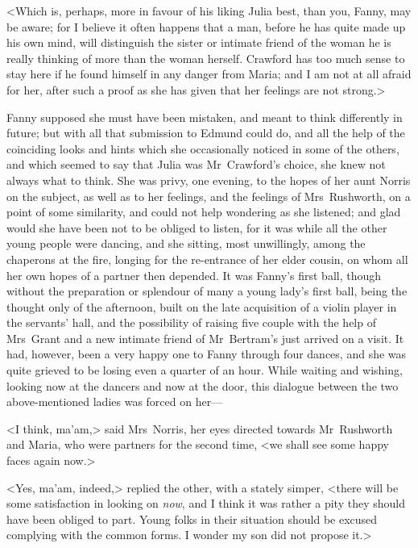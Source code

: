 <Which is, perhaps, more in favour of his liking Julia best, than you, Fanny, may be aware; for I believe it often happens that a man, before he has quite made up his own mind, will distinguish the sister or intimate friend of the woman he is really thinking of more than the woman herself. Crawford has too much sense to stay here if he found himself in any danger from Maria; and I am not at all afraid for her, after such a proof as she has given that her feelings are not strong.>

Fanny supposed she must have been mistaken, and meant to think differently in future; but with all that submission to Edmund could do, and all the help of the coinciding looks and hints which she occasionally noticed in some of the others, and which seemed to say that Julia was Mr~Crawford's choice, she knew not always what to think. She was privy, one evening, to the hopes of her aunt Norris on the subject, as well as to her feelings, and the feelings of Mrs~Rushworth, on a point of some similarity, and could not help wondering as she listened; and glad would she have been not to be obliged to listen, for it was while all the other young people were dancing, and she sitting, most unwillingly, among the chaperons at the fire, longing for the re-entrance of her elder cousin, on whom all her own hopes of a partner then depended. It was Fanny's first ball, though without the preparation or splendour of many a young lady's first ball, being the thought only of the afternoon, built on the late acquisition of a violin player in the servants' hall, and the possibility of raising five couple with the help of Mrs~Grant and a new intimate friend of Mr~Bertram's just arrived on a visit. It had, however, been a very happy one to Fanny through four dances, and she was quite grieved to be losing even a quarter of an hour. While waiting and wishing, looking now at the dancers and now at the door, this dialogue between the two above-mentioned ladies was forced on her—

<I think, ma'am,> said Mrs~Norris, her eyes directed towards Mr~Rushworth and Maria, who were partners for the second time, <we shall see some happy faces again now.>

<Yes, ma'am, indeed,> replied the other, with a stately simper, <there will be some satisfaction in looking on \textit{now}, and I think it was rather a pity they should have been obliged to part. Young folks in their situation should be excused complying with the common forms. I wonder my son did not propose it.>

